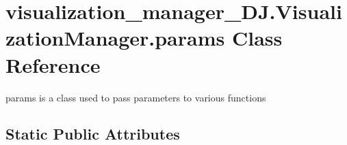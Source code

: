 \hypertarget{classvisualization__manager___d_j_1_1_visualization_manager_1_1params}{}\section{visualization\+\_\+manager\+\_\+\+D\+J.\+Visualization\+Manager.\+params Class Reference}
\label{classvisualization__manager___d_j_1_1_visualization_manager_1_1params}


params is a class used to pass parameters to various functions  


\subsection*{Static Public Attributes}
